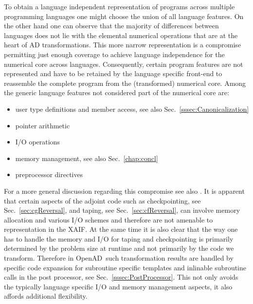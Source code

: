 \documentclass{book}
\newcommand{\OpenAD}{OpenAD}
\newcommand{\xaif}{XAIF}
\newcommand{\refsec}[1]{{Sec.~\ref{#1}}}
\begin{document}
To obtain a language independent representation of programs across multiple 
programming languages one might choose the union of all language features. 
On the other hand one can observe that the majority of differences between 
languages does not lie with the elemental numerical operations that are at the 
heart of AD transformations. This more narrow representation 
is a compromise permitting just enough coverage to achieve language 
independence for the numerical core across languages.
Consequently, certain program features are not represented and have 
to be retained by the language specific front-end to reassemble the 
complete program from the (transformed) numerical core.
Among the generic language features not considered part of the numerical core are: 
\begin{itemize}
  \parskip = -2pt
\item user type definitions and member access, see also \refsec{sssec:Canonicalization}
\item pointer arithmetic
\item I/O operations  
\item memory management, see also \refsec{chap:concl}
\item preprocessor directives
\end{itemize}
For a more general discussion regarding this compromise see also \cite{UtNa04SLD}.
It is apparent that certain aspects of the adjoint code such as 
checkpointing, see \refsec{sec:cgReversal}, and taping, see \refsec{sec:cfReversal},
can involve memory allocation and various I/O schemes and therefore 
are not amenable to representation in the \xaif. 
At the same time it is also clear that the way  one has to handle the memory and I/O for 
taping and checkpointing is primarily determined by the problem size at runtime and not
primarily by the code we transform.   
Therefore in \OpenAD\ such transformation results are handled by  specific 
code expansion for subroutine specific templates and inlinable subroutine calls 
in the post processor, see \refsec{sssec:PostProcessor}. This not only avoids 
the typically language specific I/O and memory management aspects, it also 
affords additional flexibility.   
\end{document}
